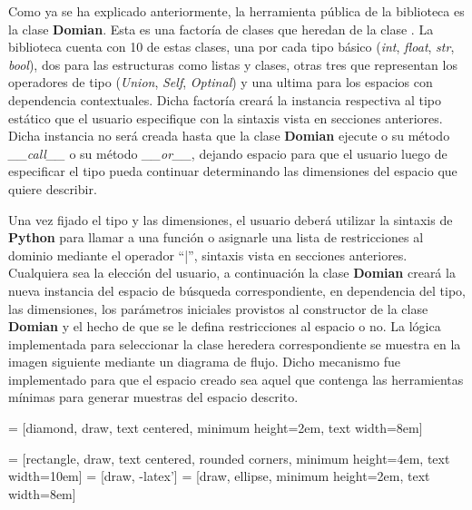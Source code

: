 Como ya se ha explicado anteriormente, la herramienta pública de la biblioteca es la clase {\bf Domian}. Esta es una
factoría de clases que heredan de la clase . La biblioteca cuenta con 10 de estas clases, una
por cada tipo básico ({\it int}, {\it float}, {\it str}, {\it bool}), dos para las estructuras como listas y clases,
otras tres que representan los operadores de tipo ({\it Union}, {\it Self}, {\it Optinal}) y una ultima para los
espacios con dependencia contextuales. Dicha factoría creará la instancia respectiva al tipo estático que el usuario
especifique con la sintaxis vista en secciones anteriores. Dicha instancia no será creada hasta que la clase
    {\bf Domian} ejecute o su método {\it \_\_call\_\_} o su método {\it \_\_or\_\_}, dejando espacio para que el usuario
luego de especificar el tipo pueda continuar determinando las dimensiones del espacio que quiere describir.

Una vez fijado el tipo y las dimensiones, el usuario deberá utilizar la sintaxis de {\bf Python} para llamar a una función
o asignarle una lista de restricciones al dominio mediante el operador ``|'', sintaxis vista en secciones anteriores.
Cualquiera sea la elección del usuario, a continuación la clase  {\bf Domian}  creará la nueva instancia del espacio de
búsqueda correspondiente, en dependencia del tipo, las dimensiones, los parámetros iniciales provistos al constructor
de la clase  {\bf Domian}  y el hecho de que se le defina restricciones al espacio o no. La lógica implementada para seleccionar
la clase heredera correspondiente se muestra en la imagen siguiente mediante un diagrama de flujo. Dicho mecanismo fue
implementado para que el espacio creado sea aquel que contenga las herramientas mínimas para generar muestras del
espacio descrito.
\newline
\newline



 = [diamond, draw, text centered, minimum height=2em, text width=8em]


 = [rectangle, draw, text centered, rounded corners, minimum height=4em, text width=10em]
 = [draw, -latex']
 = [draw, ellipse, minimum height=2em, text width=8em]

